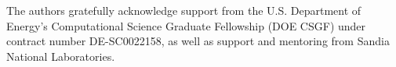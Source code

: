 The authors gratefully acknowledge support from the U.S. Department of Energy’s Computational Science Graduate Fellowship (DOE CSGF) under contract number DE-SC0022158, as well as support and mentoring from Sandia National Laboratories. 
